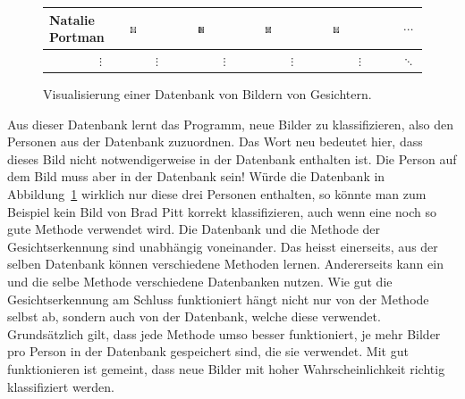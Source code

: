 \begin{figure}[ht]
\begin{tabular}{l m{2cm} m{2cm} m{2cm} m{2cm} c}
		Natalie Portman & \includegraphics[width=0.1\textwidth]{images/intro/class2_0} & \includegraphics[width=0.1\textwidth]{images/intro/class2_1} & \includegraphics[width=0.1\textwidth]{images/intro/class2_2} & \includegraphics[width=0.1\textwidth]{images/intro/class2_3} & $\cdots$ \\ \hline
		$\qquad\qquad\vdots$ & $\qquad\vdots$ & $\qquad\vdots$ & $\qquad\vdots$ & $\qquad\vdots$ & $\ddots$ \\
	\end{tabular}
	\caption{Visualisierung einer Datenbank von Bildern von Gesichtern.}
	\label{fig:introduction}
\end{figure}
Aus dieser Datenbank \glqq{}lernt\grqq{} das Programm, neue Bilder zu klassifizieren, also den Personen aus der Datenbank zuzuordnen.
Das Wort \glqq{}neu\grqq{} bedeutet hier, dass dieses Bild nicht notwendigerweise in der Datenbank enthalten ist.
Die Person auf dem Bild muss aber in der Datenbank sein!
Würde die Datenbank in Abbildung~\ref{fig:introduction} wirklich nur diese drei Personen enthalten, so könnte man zum Beispiel kein Bild von Brad Pitt korrekt klassifizieren, auch wenn eine noch so gute Methode verwendet wird.
Die Datenbank und die Methode der Gesichtserkennung sind unabhängig voneinander.
Das heisst einerseits, aus der selben Datenbank können verschiedene Methoden lernen.
Andererseits kann ein und die selbe Methode verschiedene Datenbanken nutzen.
Wie gut die Gesichtserkennung am Schluss funktioniert hängt nicht nur von der Methode selbst ab, sondern auch von der Datenbank, welche diese verwendet.
Grundsätzlich gilt, dass jede Methode umso besser funktioniert, je mehr Bilder pro Person in der Datenbank gespeichert sind, die sie verwendet.
Mit \glqq{}gut funktionieren\grqq{} ist gemeint, dass neue Bilder mit hoher Wahrscheinlichkeit richtig klassifiziert werden.

